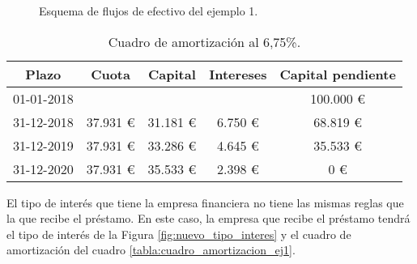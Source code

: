 \begin{figure}[H]
    \centering
    \caption{Esquema de flujos de efectivo del ejemplo 1.}
    \label{fig:flujo-efectivo-ejemplo1}
\end{figure}


\begin{table}[H]
    \centering
    \begin{tabular}{|c|c|c|c|c|}
        \hline
        \rowcolor{blue!30}
        \textbf{Plazo} & \textbf{Cuota} & \textbf{Capital} & \textbf{Intereses} & \textbf{Capital pendiente} \\
        \hline
        01-01-2018 &   &   &   & 100.000 € \\
        \hline
        31-12-2018 & 37.931 € & 31.181 € & 6.750 € & 68.819 € \\
        \hline
        31-12-2019 & 37.931 € & 33.286 € & 4.645 € & 35.533 € \\
        \hline
        31-12-2020 & 37.931 € & 35.533 € & 2.398 € & 0 € \\
        \hline
    \end{tabular}
    \caption{Cuadro de amortización al 6,75\%.}
    \label{tabla:cuadro_amortizacion}
\end{table}

El tipo de interés que tiene la empresa financiera no tiene las mismas reglas que la que recibe el préstamo. En este caso, la empresa que recibe el préstamo tendrá el tipo de interés de la Figura \ref{fig:nuevo_tipo_interes} y el cuadro de amortización del cuadro \ref{tabla:cuadro_amortizacion_ej1}.

